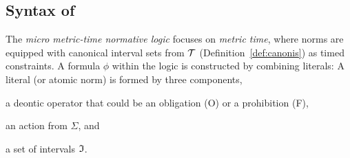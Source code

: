 
\subsection{Syntax of \TDDLfm}
The \emph{micro metric-time normative logic} focuses on \emph{metric time}, where norms are equipped with canonical interval sets from $\mathcal{T}$ (Definition~\ref{def:canonis}) as timed constraints. A  formula $\phi$  within the logic is constructed by combining literals:
A literal (or atomic norm) is formed by three components, \begin{inparaenum}[(i)]
    \item a deontic operator that could be an obligation (O) or a prohibition (F),
    \item an action from $\Sigma$, and
    \item a set of intervals $\mathfrak{I}$.
\end{inparaenum} 

